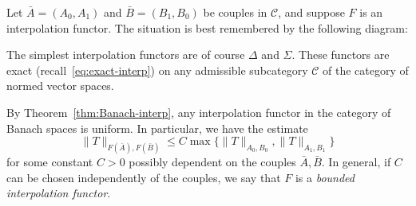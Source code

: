 Let $\bar{A}=(A_0,A_1)$ and $\bar{B}=(B_1,B_0)$ be couples in $\mathscr{C}$, and suppose $F$ is an interpolation functor. The situation is best remembered by the following diagram:
\begin{center}
\end{center}

\begin{example}
The simplest interpolation functors are of course $\Delta$ and $\Sigma$. These functors are exact (recall~\eqref{eq:exact-interp}) on any admissible subcategory $\mathscr{C}$ of the category of normed vector spaces.
\end{example}

\begin{remark}
By Theorem~\ref{thm:Banach-interp}, any interpolation functor in the category of Banach spaces is uniform. In particular, we have the estimate
\begin{equation*}
    \|T\|_{F(\bar{A}),F(\bar{B})} \le C\max\{\|T\|_{A_0,B_0}, \|T\|_{A_1,B_1}\}
\end{equation*}
for some constant $C>0$ possibly dependent on the couples $\bar{A},\bar{B}$. In general, if $C$ can be chosen independently of the couples, we say that $F$ is a \emph{bounded interpolation functor}.
\end{remark}